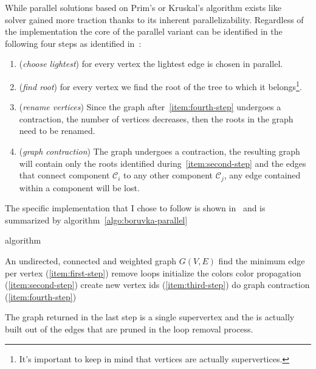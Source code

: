 \documentclass[a4paper,10pt]{article}
\begin{document}
While parallel solutions based on Prim's or Kruskal's algorithm exists like~\cite{prim-parallel}~\cite{filter-kruskal} \brkas solver gained more traction thanks to its inherent parallelizability. Regardless of the implementation the core of the parallel variant can be identified in the following four steps as identified in~\cite{boruvka-steps}:
\begin{enumerate}
	\item\label{item:first-step} (\textit{choose lightest}) for every vertex the lightest edge is chosen in parallel.
	\item\label{item:second-step} (\textit{find root}) for every vertex we find the root of the tree to which it belongs\footnote{It's important to keep in mind that vertices are actually supervertices.}.
	\item\label{item:third-step} (\textit{rename vertices}) Since the graph after~\ref{item:fourth-step} undergoes a contraction, the number of vertices decreases, then the roots in the graph need to be renamed.
	\item\label{item:fourth-step} (\textit{graph contraction}) The graph undergoes a contraction, the resulting graph will contain only the roots identified during~\ref{item:second-step} and the edges that connect component $\mathcal{C}_i$ to any other component $\mathcal{C}_j$, any edge contained within a component will be lost.
\end{enumerate}

The specific implementation that I chose to follow is shown in~\cite{generic-he-boruvka} and is summarized by algorithm~\ref{algo:boruvka-parallel}

\begin{algorithm}
	\caption{\brkas algorithm}\label{algo:boruvka-parallel}
	\begin{algorithmic}[1]
		\REQUIRE An undirected, connected and weighted graph $G(V, E)$
		\STATE find the minimum edge per vertex (\ref{item:first-step})
		\STATE remove loops
		\STATE initialize the colors
		\STATE color propagation (\ref{item:second-step})
		\ENDWHILE
		\STATE create new vertex ids (\ref{item:third-step})
		\STATE do graph contraction (\ref{item:fourth-step})
		\ENDWHILE
	\end{algorithmic}
\end{algorithm}

The graph returned in the last step is a single supervertex and the \mst is actually built out of the edges that are pruned in the loop removal process.
\end{document}
